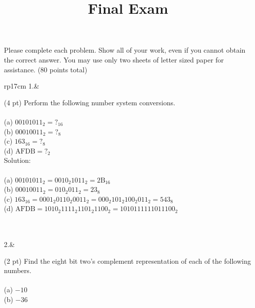 \documentclass{article}
\title{Final Exam}
\date{}
\begin{document}
\maketitle
Please complete each problem.  Show all of your work, even if you cannot obtain the correct answer.  You may use only two sheets of letter sized paper for assistance. (80 points total)
\begin{longtable}[l]{rp{17cm}}
1.&\begin{minipage}[t]{\linewidth}(4 pt) Perform the following number system conversions. \\
\\
(a) $00101011_2 = ?_{16}$ \\
(b) $00010011_2 = ?_8$ \\
(c) $163_{16} = ?_8$ \\
(d) $\textrm{AFDB} = ?_2$ \\

Solution: \\
\\
(a) $00101011_2 = 0010_2 1011_2 = 2\textrm{B}_{16}$ \\
(b) $00010011_2 = 010_2 011_2 = 23_8$ \\
(c) $163_{16} = 0001_2 0110_2 0011_2 = 000_2 101_2 100_2 011_2 = 543_8$ \\
(d) $\textrm{AFDB} = 1010_2 1111_2 1101_2 1100_2 = 1010111111011100_2$ \\
\\
\end{minipage}\\
\medskip
2.&\begin{minipage}[t]{\linewidth}(2 pt) Find the eight bit two's complement representation of each of the following numbers. \\
\\
(a) $-10$\\
(b) $-36$


\end{minipage}
\end{longtable}
\end{document}
